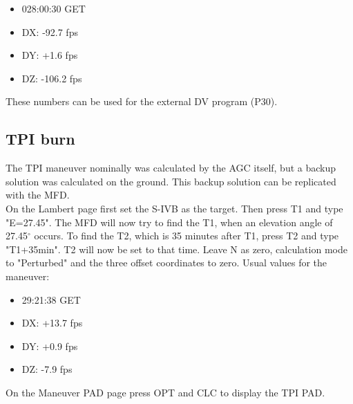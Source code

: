 \documentclass[11pt]{article} %
\begin{document}
\begin{itemize}
	\item{028:00:30 GET}
	\item{DX: -92.7 fps}
	\item{DY: +1.6 fps}
	\item{DZ: -106.2 fps}
\end{itemize}

These numbers can be used for the external DV program (P30).

\subsection{TPI burn}

The TPI maneuver nominally was calculated by the AGC itself, but a backup solution was calculated on the ground. This backup solution can be replicated with the MFD.\\
On the Lambert page first set the S-IVB as the target. Then press T1 and type "E=27.45". The MFD will now try to find the T1, when an elevation angle of 27.45$^{\circ}$ occurs. To find the T2, which is 35 minutes after T1, press T2 and type "T1+35min". T2 will now be set to that time. Leave N as zero, calculation mode to "Perturbed" and the three offset coordinates to zero. Usual values for the maneuver:

\begin{itemize}
	\item{29:21:38 GET}
	\item{DX: +13.7 fps}
	\item{DY: +0.9 fps}
	\item{DZ: -7.9 fps}
\end{itemize}
	
On the Maneuver PAD page press OPT and CLC to display the TPI PAD.\\



\end{document}
